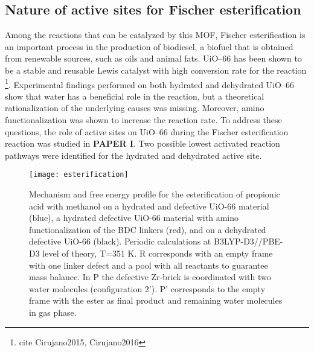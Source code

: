 \subsection{Nature of active sites for Fischer esterification}
 Among the reactions that can be catalyzed by this MOF, Fischer esterification is an important process in the production of biodiesel, a biofuel that is obtained from renewable sources, such as oils and animal fats. UiO--66 has been shown to be a stable and reusable Lewis catalyst with high conversion rate for the reaction \footnote{cite Cirujano2015, Cirujano2016}. Experimental findings performed on both hydrated and dehydrated UiO--66 show that water has a beneficial role in the reaction, but a theoretical rationalization of the underlying causes was missing. Moreover, amino functionalization was shown to increase the reaction rate. To address these questions, the role of active sites on UiO--66 during the Fischer esterification reaction was studied in \textbf{PAPER I}. Two possible lowest activated reaction pathways were identified for the hydrated and dehydrated active site. \\
\begin{figure}[!htbp]
	\centering
	\texttt{[image: esterification]}
	\caption{Mechanism and free energy profile for the esterification of propionic acid with methanol on a hydrated and defective UiO-66 material (blue), a hydrated defective UiO-66 material with amino functionalization of the BDC linkers (red), and on a dehydrated defective UiO-66 (black). Periodic calculations at B3LYP-D3//PBE-D3 level of theory, T=351 K. R corresponds with an empty frame with one linker defect and a pool with all reactants to guarantee mass balance. In P the defective Zr-brick is coordinated with two water molecules (configuration 2’). P’ corresponds to the empty frame with the ester as final product and remaining water molecules in gas phase.}
	\label{fig:esterification}
\end{figure}

